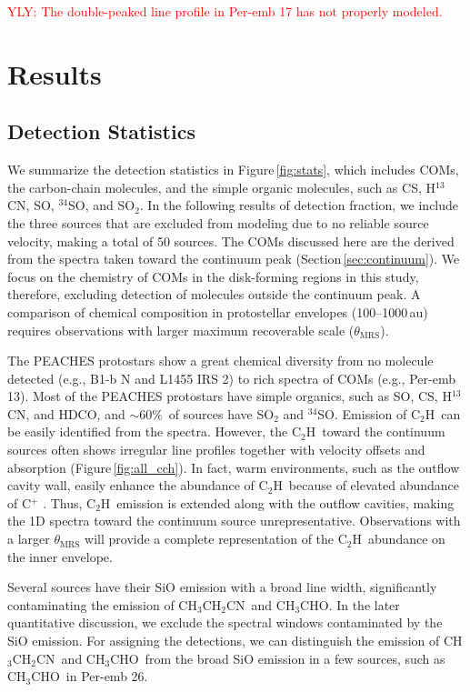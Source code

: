 \documentclass[twocolumn]{aastex62}
\newcommand{\htcn}{\mbox{H$^{13}$CN}}
\newcommand{\acetaldehyde}{\mbox{CH$_{3}$CHO}}
\newcommand{\ethylcyanide}{\mbox{CH$_{3}$CH$_{2}$CN}}
\newcommand{\cch}{\mbox{C$_2$H}}
\begin{document}
\textcolor{red}{YLY: The double-peaked line profile in Per-emb 17 has not properly modeled.}

\section{Results}
\label{sec:results}
\subsection{Detection Statistics}
We summarize the detection statistics in Figure\,\ref{fig:stats}, which includes COMs, the carbon-chain molecules, and the simple organic molecules, such as CS, \htcn, SO, $^{34}$SO, and SO$_{2}$.  In the following results of detection fraction, we include the three sources that are excluded from modeling due to no reliable source velocity, making a total of 50 sources.  The COMs discussed here are the derived from the spectra taken toward the continuum peak (Section\,\ref{sec:continuum}).  We focus on the chemistry of COMs in the disk-forming regions in this study, therefore, excluding detection of molecules outside the continuum peak.  A comparison of chemical composition in protostellar envelopes (100--1000\,au) requires observations with larger maximum recoverable scale ($\theta_\text{MRS}$).

The PEACHES protostars show a great chemical diversity from no molecule detected (e.g., B1-b N and L1455 IRS 2) to rich spectra of COMs (e.g., Per-emb 13).  Most of the PEACHES protostars have simple organics, such as SO, CS, \htcn, and HDCO, and $\sim 60$\%\ of sources have SO$_{2}$ and $^{34}$SO.  Emission of \cch\ can be easily identified from the spectra.  However, the \cch\ toward the continuum sources often shows irregular line profiles together with velocity offsets and absorption (Figure\,\ref{fig:all_cch}).  In fact, warm environments, such as the outflow cavity wall, easily enhance the abundance of \cch\ because of elevated abundance of C$^{+}$ \citep[e.g., ][]{2018ApJ...864...76Z,2019ApJ...873L..21I}.  Thus, \cch\ emission is extended along with the outflow cavities, making the 1D spectra toward the continuum source unrepresentative.  Observations with a larger $\theta_\text{MRS}$ will provide a complete representation of the \cch\ abundance on the inner envelope.

Several sources have their SiO emission with a broad line width, significantly contaminating the emission of \ethylcyanide\ and \acetaldehyde.  In the later quantitative discussion, we exclude the spectral windows contaminated by the SiO emission.  For assigning the detections, we can distinguish the emission of \ethylcyanide\ and \acetaldehyde\ from the broad SiO emission in a few sources, such as \acetaldehyde\ in Per-emb 26.
\end{document}
